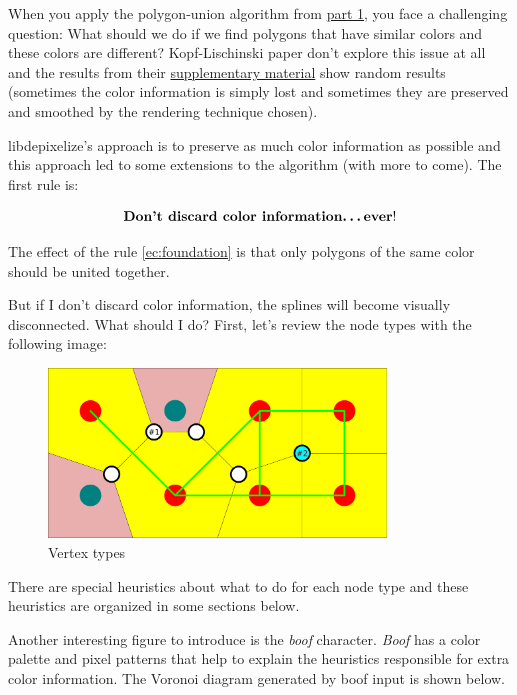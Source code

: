 When you apply the polygon-union algorithm from \hyperref[blogpart1]{part 1},
you face a challenging question: What should we do if we find polygons that have
similar colors and these colors are different? Kopf-Lischinski paper don't
explore this issue at all and the results from their
\href{http://research.microsoft.com/en-us/um/people/kopf/pixelart/supplementary/index.html}{supplementary
material} show random results (sometimes the color information is simply lost
and sometimes they are preserved and smoothed by the rendering technique
chosen).

libdepixelize's approach is to preserve as much color information as possible
and this approach led to some extensions to the algorithm (with more to come).
The first rule is:

\begin{equation}
  \label{ec:foundation}
  \text{\textbf{Don't discard color information\ldots ever}!}
\end{equation}

The effect of the rule \ref{ec:foundation} is that only polygons of the same
color should be united together.

But if I don't discard color information, the splines will become visually
disconnected. What should I do? First, let's review the node types with the
following image:

\begin{figure}[H]
  \centering
  \includegraphics[width=0.8\textwidth]{assets/voronoi3.pdf}
  \caption{Vertex types}
\end{figure}

There are special heuristics about what to do for each node type and these
heuristics are organized in some sections below.

Another interesting figure to introduce is the \emph{boof} character.
\emph{Boof} has a color palette and pixel patterns that help to explain the
heuristics responsible for extra color information. The Voronoi diagram
generated by boof input is shown below.

